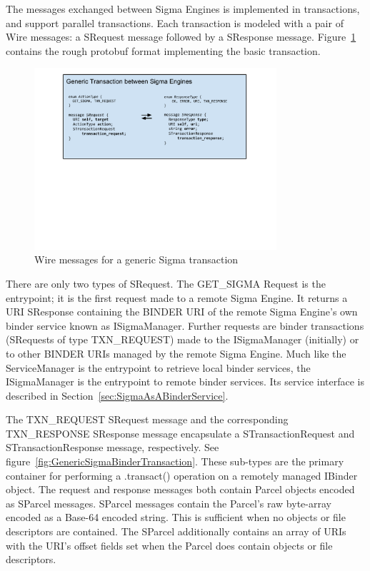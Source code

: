 \documentclass[prodmode]{acmlarge}
\begin{document}
The messages exchanged between Sigma Engines is implemented in transactions, and support parallel transactions. Each transaction is modeled with a pair of Wire messages: a SRequest message followed by a SResponse message. Figure~\ref{fig:GenericSigmaTransaction} contains the rough protobuf format implementing the basic transaction.

\begin{figure}[h!]
\centering
\includegraphics[width=0.8\textwidth]{drawings/WireTransaction.pdf}
\caption{Wire messages for a generic Sigma transaction}
\label{fig:GenericSigmaTransaction}
\end{figure}

There are only two types of SRequest. The GET\_SIGMA Request is the entrypoint; it is the first request made to a remote Sigma Engine. It returns a URI SResponse containing the BINDER URI of the remote Sigma Engine's own binder service known as ISigmaManager. Further requests are binder transactions (SRequests of type TXN\_REQUEST) made to the ISigmaManager (initially) or to other BINDER URIs managed by the remote Sigma Engine. Much like the ServiceManager is the entrypoint to retrieve local binder services, the ISigmaManager is the entrypoint to remote binder services. Its service interface is described in Section~\ref{sec:SigmaAsABinderService}.

The TXN\_REQUEST SRequest message and the corresponding TXN\_RESPONSE SResponse message encapsulate a STransactionRequest and STransactionResponse message, respectively. See figure~\ref{fig:GenericSigmaBinderTransaction}. These sub-types are the primary container for performing a .transact() operation on a remotely managed IBinder object. The request and response messages both contain Parcel objects encoded as SParcel messages. SParcel messages contain the Parcel's raw byte-array encoded as a Base-64 encoded string. This is sufficient when no objects or file descriptors are contained. The SParcel additionally contains an array of URIs with the URI's offset fields set when the Parcel does contain objects or file descriptors.
\end{document}
